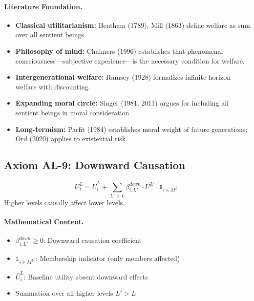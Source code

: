 \paragraph{Literature Foundation.}
\begin{itemize}
\item \textbf{Classical utilitarianism:} Bentham (1789), Mill (1863) define 
welfare as sum over all sentient beings.
\item \textbf{Philosophy of mind:} Chalmers (1996) establishes that phenomenal 
consciousness---subjective experience---is the necessary condition for welfare.
\item \textbf{Intergenerational welfare:} Ramsey (1928) formalizes infinite-horizon 
welfare with discounting.
\item \textbf{Expanding moral circle:} Singer (1981, 2011) argues for including 
all sentient beings in moral consideration.
\item \textbf{Long-termism:} Parfit (1984) establishes moral weight of future 
generations; Ord (2020) applies to existential risk.
\end{itemize}

\subsection{Axiom AL-9: Downward Causation}

\begin{tcolorbox}[colback=gray!5!white, colframe=gray!75!black, title=Axiom AL-9: Downward Causation]
\begin{equation}
\boxed{
U^L_i = \bar{U}^L_i + \sum_{L' > L} \beta^{down}_{i,L'} \cdot U^{L'} \cdot \mathbb{1}_{i \in M^{L'}}
}
\end{equation}
Higher levels causally affect lower levels.
\end{tcolorbox}

\paragraph{Mathematical Content.}
\begin{itemize}
\item $\beta^{down}_{i,L'} \geq 0$: Downward causation coefficient
\item $\mathbb{1}_{i \in M^{L'}}$: Membership indicator (only members affected)
\item $\bar{U}^L_i$: Baseline utility absent downward effects
\item Summation over all higher levels $L' > L$
\end{itemize}


